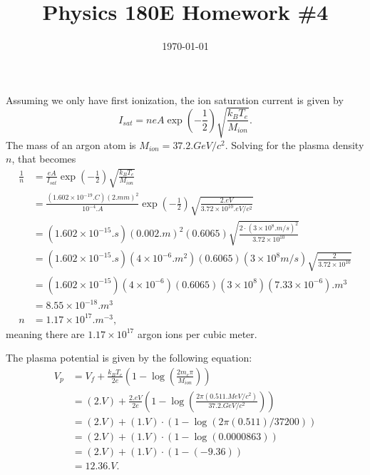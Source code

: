 \documentclass{article}
\date{\today}
\title{Physics 180E Homework \#4}
\begin{document}
\maketitle

\begin{prob}
\end{prob}
Assuming we only have first ionization, the ion saturation current is given by
\[ I_{sat} = n e A \exp \left( - \frac{1}{2} \right)  \sqrt{ \frac{k_B T_e}{M_{ion}}}. \]
The mass of an argon atom is $M_{ion} = 37.2 \si{.GeV/c^2}$. Solving for the plasma density $n$, that becomes
\begin{align*}
\frac{1}{n} &= \frac{eA}{I_{sat}} \exp \left( - \frac{1}{2} \right)  \sqrt{ \frac{k_B T_e}{M_{ion}}} \\
  &= \frac{(1.602 \times 10^{-19} \si{.C})(2\si{.mm})^2}{10^{-4} \si{.A}} \exp \left( - \frac{1}{2} \right)  \sqrt{ \frac{2 \si{.eV}}{3.72 \times 10^{10} \si{.eV/c^2}}} \\
  &= (1.602 \times 10^{-15} \si{.s})(0.002\si{.m})^2 (0.6065) \sqrt{ \frac{2 \cdot (3 \times 10^8 \si{.m/s})^2}{3.72 \times 10^{10}}} \\
  &= (1.602 \times 10^{-15} \si{.s})(4 \times 10^{-6} \si{.m^2}) (0.6065) (3 \times 10^8 \si{m/s}) \sqrt{ \frac{2}{3.72 \times 10^{10}}} \\
  &= (1.602 \times 10^{-15})(4 \times 10^{-6}) (0.6065) (3 \times 10^8) (7.33 \times 10^{-6}) \si{.m^3} \\
  &= 8.55 \times 10^{-18} \si{.m^3} \\
  n &= 1.17 \times 10^{17} \si{.m^{-3}},
\end{align*}
meaning there are $1.17 \times 10^{17}$ argon ions per cubic meter.
\par
The plasma potential is given by the following equation:
\begin{align*}
    V_p &= V_f + \frac{k_B T_e}{2 e} \left( 1 - \log \left( \frac{2 m_e \pi}{M_{ion}} \right) \right) \\
        &= (2\si{.V}) + \frac{2 \si{.eV}}{2 e} \left( 1 - \log \left( \frac{2 \pi (0.511 \si{.MeV/c^2})}{37.2 \si{.GeV/c^2}} \right) \right) \\
        &= (2\si{.V}) + (1 \si{.V}) \cdot \left( 1 - \log \left( 2 \pi (0.511)/37200 \right) \right) \\
        &= (2\si{.V}) + (1 \si{.V}) \cdot \left( 1 - \log (0.0000863) \right) \\
        &= (2\si{.V}) + (1 \si{.V}) \cdot \left( 1 - (-9.36) \right) \\
        &= 12.36 \si{.V}.
\end{align*}
\end{document}
